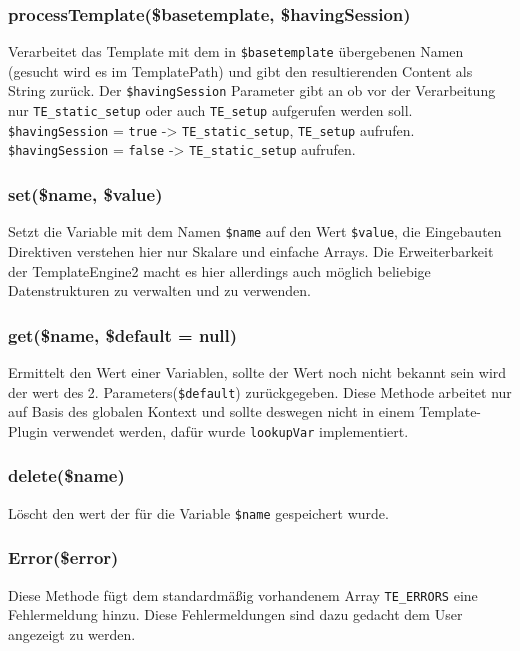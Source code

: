 \documentclass[a4paper,10pt]{article}
\begin{document}
\subsubsection{processTemplate(\$basetemplate, \$havingSession)}
Verarbeitet das Template mit dem in {\tt \$basetemplate} \"ubergebenen Namen (gesucht wird es im TemplatePath) und gibt den resultierenden Content
als String zur\"uck. Der {\tt \$havingSession} Parameter gibt an ob vor der Verarbeitung nur {\tt TE\_static\_setup} oder auch {\tt TE\_setup} aufgerufen werden soll.\newline
{\tt \$havingSession} = {\tt true} -{\textgreater} {\tt TE\_static\_setup}, {\tt TE\_setup} aufrufen.\newline
{\tt \$havingSession} = {\tt false} -{\textgreater} {\tt TE\_static\_setup} aufrufen.

\subsubsection{set(\$name, \$value)}
Setzt die Variable mit dem Namen {\tt \$name} auf den Wert {\tt \$value}, die Eingebauten Direktiven verstehen hier nur Skalare und einfache Arrays.
Die Erweiterbarkeit der TemplateEngine2 macht es hier allerdings auch m\"oglich beliebige Datenstrukturen zu verwalten und zu verwenden.

\subsubsection{get(\$name, \$default = null)}
Ermittelt den Wert einer Variablen, sollte der Wert noch nicht bekannt sein wird der wert des 2. Parameters({\tt \$default}) zur\"uckgegeben.
Diese Methode arbeitet nur auf Basis des globalen Kontext und sollte deswegen nicht in einem Template-Plugin verwendet werden, daf\"ur wurde {\tt lookupVar} implementiert.

\subsubsection{delete(\$name)}
L\"oscht den wert der f\"ur die Variable {\tt \$name} gespeichert wurde.

\subsubsection{Error(\$error)}
Diese Methode f\"ugt dem standardm\"a\ss{}ig vorhandenem Array {\tt TE\_ERRORS} eine Fehlermeldung hinzu. Diese Fehlermeldungen sind dazu gedacht dem User angezeigt zu werden.
\end{document}
